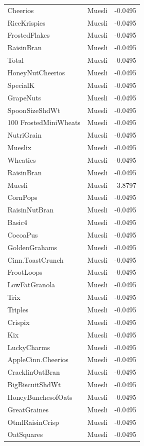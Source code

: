 \begin{longtable}{llr}
Cheerios & Muesli & -0.0495 \\
RiceKrispies & Muesli & -0.0495 \\
FrostedFlakes & Muesli & -0.0495 \\
RaisinBran & Muesli & -0.0495 \\
Total & Muesli & -0.0495 \\
HoneyNutCheerios & Muesli & -0.0495 \\
SpecialK & Muesli & -0.0495 \\
GrapeNuts & Muesli & -0.0495 \\
SpoonSizeShdWt & Muesli & -0.0495 \\
100%
FrostedMiniWheats & Muesli & -0.0495 \\
NutriGrain & Muesli & -0.0495 \\
Mueslix & Muesli & -0.0495 \\
Wheaties & Muesli & -0.0495 \\
RaisinBran & Muesli & -0.0495 \\
Muesli & Muesli & 3.8797 \\
CornPops & Muesli & -0.0495 \\
RaisinNutBran & Muesli & -0.0495 \\
Basic4 & Muesli & -0.0495 \\
CocoaPus & Muesli & -0.0495 \\
GoldenGrahams & Muesli & -0.0495 \\
Cinn.ToastCrunch & Muesli & -0.0495 \\
FrootLoops & Muesli & -0.0495 \\
LowFatGranola & Muesli & -0.0495 \\
Trix & Muesli & -0.0495 \\
Triples & Muesli & -0.0495 \\
Crispix & Muesli & -0.0495 \\
Kix & Muesli & -0.0495 \\
LuckyCharms & Muesli & -0.0495 \\
AppleCinn.Cheerios & Muesli & -0.0495 \\
CracklinOatBran & Muesli & -0.0495 \\
BigBiscuitShdWt & Muesli & -0.0495 \\
HoneyBunchesofOats & Muesli & -0.0495 \\
GreatGraines & Muesli & -0.0495 \\
OtmlRaisinCrisp & Muesli & -0.0495 \\
OatSquares & Muesli & -0.0495 \\

\end{longtable}
